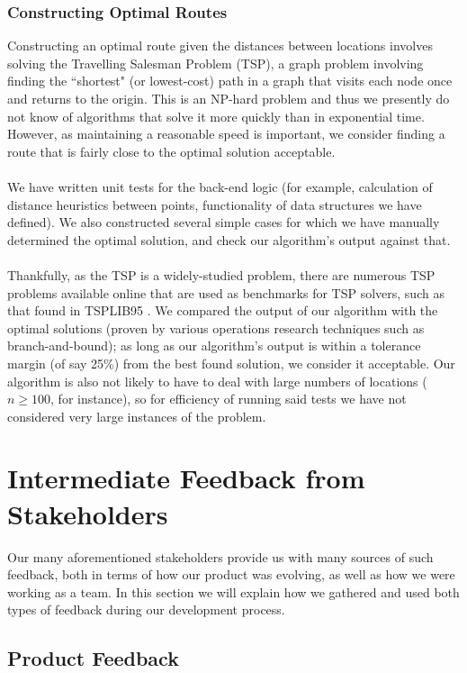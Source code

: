 \documentclass[a4paper, 10pt]{report}
\begin{document}
\subsubsection{Constructing Optimal Routes}
Constructing an optimal route given the distances between locations involves solving the Travelling Salesman Problem (TSP), a graph problem involving finding the ``shortest" (or lowest-cost) path in a graph that visits each node once and returns to the origin. This is an NP-hard problem \cite{tsp-np-hard} and thus we presently do not know of algorithms that solve it more quickly than in exponential time. However, as maintaining a reasonable speed is important, we consider finding a route that is fairly close to the optimal solution acceptable.
\\\\ We have written unit tests for the back-end logic (for example, calculation of distance heuristics between points, functionality of data structures we have defined). We also constructed several simple cases for which we have manually determined the optimal solution, and check our algorithm's output against that. \\\\
Thankfully, as the TSP is a widely-studied problem, there are numerous TSP problems available online that are used as benchmarks for TSP solvers, such as that found in TSPLIB95 \cite{tsp-lib-95}. We compared the output of our algorithm with the optimal solutions (proven by various operations research techniques such as branch-and-bound); as long as our algorithm's output is within a tolerance margin (of say 25\%) from the best found solution, we consider it acceptable. Our algorithm is also not likely to have to deal with large numbers of locations ($n \geq 100$, for instance), so for efficiency of running said tests we have not considered very large instances of the problem.
\section{Intermediate Feedback from Stakeholders}
Our many aforementioned stakeholders provide us with many sources of such feedback, both in terms of how our product was evolving, as well as how we were working as a team. In this section we will explain how we gathered and used both types of feedback during our development process.
\subsection{Product Feedback}
\end{document}
